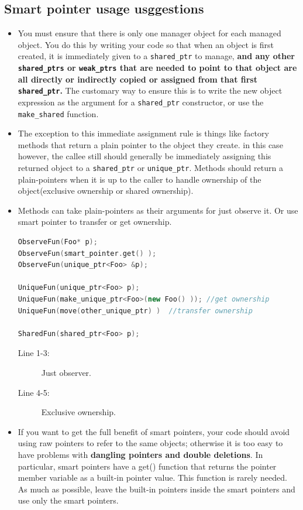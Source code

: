 \documentclass[a4paper,11pt,twoside]{book}
\begin{document}
\subsection{Smart pointer usage usggestions}

\begin{itemize}

\item You must ensure that there is only one manager object for each managed object. You do this by writing your code so that when an object is first created, it is immediately given to a \texttt{shared\_ptr} to manage, \textbf{and any other \texttt{shared\_ptrs} or \texttt{weak\_ptrs} that are needed to point to that object are all directly or indirectly copied or assigned from that first \texttt{shared\_ptr}.} The customary way to ensure this is to write the new object expression as the argument for a \texttt{shared\_ptr} constructor, or use the \texttt{make\_shared} function.

\item The exception to this immediate assignment rule is things like factory methods that return a plain pointer to the object they create. in this case however, the callee still should generally be immediately assigning this returned object to a \texttt{shared\_ptr} or \texttt{unique\_ptr}.  Methods should return a plain-pointers when it is up to the caller to handle ownership of the object(exclusive ownership or shared ownership).


\item Methods can take plain-pointers as their arguments for just observe it. Or use smart pointer to transfer or get ownership.
\begin{lstlisting}[frame=single, language=c++]
ObserveFun(Foo* p);
ObserveFun(smart_pointer.get() );
ObserveFun(unique_ptr<Foo> &p);

UniqueFun(unique_ptr<Foo> p);
UniqueFun(make_unique_ptr<Foo>(new Foo() )); //get ownership
UniqueFun(move(other_unique_ptr) )  //transfer ownership

SharedFun(shared_ptr<Foo> p);
\end{lstlisting}
\begin{description}
	\item[Line 1-3:] Just observer.
	\item[Line 4-5:] Exclusive ownership.
\end{description}

\item If you want to get the full benefit of smart pointers, your code should avoid using raw pointers to refer to the same objects; otherwise it is too easy to have problems with \textbf{dangling pointers and double deletions}. In particular, smart pointers have a get() function that returns the pointer member variable as a built-in pointer value. This function is rarely needed. As much as possible, leave the built-in pointers inside the smart pointers and use only the smart pointers.



\end{itemize}
\end{document}
